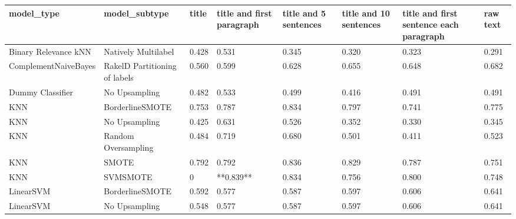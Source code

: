 \begin{tabular}{llllllll}
\toprule
                     model\_type &                 model\_subtype & title & title and first paragraph & title and 5 sentences & title and 10 sentences & title and first sentence each paragraph & raw text \\
\midrule
           Binary Relevance kNN &           Natively Multilabel & 0.428 &                     0.531 &                 0.345 &                  0.320 &                                   0.323 &    0.291 \\
           ComplementNaiveBayes & RakelD Partitioning of labels & 0.560 &                     0.599 &                 0.628 &                  0.655 &                                   0.648 &    0.682 \\
               Dummy Classifier &                 No Upsampling & 0.482 &                     0.533 &                 0.499 &                  0.416 &                                   0.491 &    0.491 \\
                            KNN &               BorderlineSMOTE & 0.753 &                     0.787 &                 0.834 &                  0.797 &                                   0.741 &    0.775 \\
                            KNN &                 No Upsampling & 0.425 &                     0.631 &                 0.526 &                  0.352 &                                   0.330 &    0.345 \\
                            KNN &           Random Oversampling & 0.484 &                     0.719 &                 0.680 &                  0.501 &                                   0.411 &    0.523 \\
                            KNN &                         SMOTE & 0.792 &                     0.792 &                 0.836 &                  0.829 &                                   0.787 &    0.751 \\
                            KNN &                      SVMSMOTE &     0 &                 **0.839** &                 0.834 &                  0.756 &                                   0.800 &    0.748 \\
                      LinearSVM &               BorderlineSMOTE & 0.592 &                     0.577 &                 0.587 &                  0.597 &                                   0.606 &    0.641 \\
                      LinearSVM &                 No Upsampling & 0.548 &                     0.577 &                 0.587 &                  0.597 &                                   0.606 &    0.641 \\

\end{tabular}
